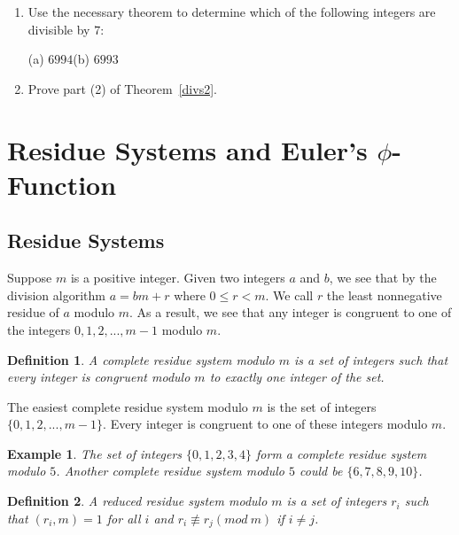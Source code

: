 \documentclass[12pt,letterpaper]{book}
\newtheorem{definition}{Definition}
\newtheorem{example}{Example}
\begin{document}
\begin{enumerate}
\item{Use the necessary theorem to determine which of the following integers are
divisible by $7$:

\medskip

\noindent (a) $6994$\hspace*{2in}(b) $6993$}

\item{Prove part (2) of Theorem~\ref{divs2}.}

\end{enumerate}

\newpage

\section{Residue Systems and Euler's $\phi$-Function}

\subsection{Residue Systems} 

Suppose $m$ is a positive integer.  Given two integers $a$ and $b$,
we see that by the division algorithm $a=bm+r$ where $0\leq
r<m$.  We call $r$ the least nonnegative residue of $a$ modulo $m$.
As a result, we see that any integer is congruent to one of the
integers $0,1,2,...,m-1$ modulo $m$. 
\begin{definition}
A complete residue system modulo $m$ is a set of integers such that
every integer is congruent modulo $m$ to exactly one integer of the
set.
\end{definition}
The easiest complete residue system modulo $m$ is the set of
integers\\ $\{0,1,2,...,m-1\}$.  Every integer is congruent to one of
these integers modulo $m$.

\begin{example}
The set of integers $\{0,1,2,3,4\}$ form a complete residue system
modulo $5$.  Another complete residue system modulo $5$ could be
$\{6,7,8,9,10\}$.
\end{example}
\begin{definition}
A reduced residue system modulo $m$ is a set of integers $r_i$ such
that $(r_i,m)=1$ for all $i$ and $r_i \not\equiv r_j (mod \ m)$ if $i\neq
j$.
\end{definition}
\end{document}
